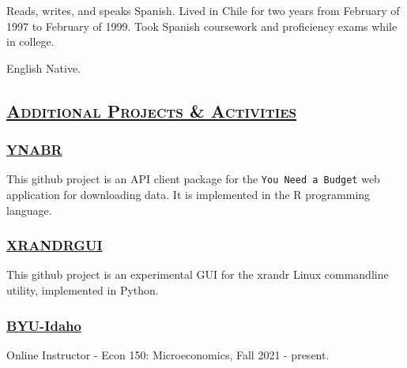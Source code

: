 \documentclass[
  letterpaper,
  DIV=11,
  numbers=noendperiod]{scrartcl}
\begin{document}
Reads, writes, and speaks Spanish. Lived in Chile for two years from
February of 1997 to February of 1999. Took Spanish coursework and
proficiency exams while in college.

English Native.

\hypertarget{additional-projects-activities}{%
\subsection{\texorpdfstring{\textsc{\ul{Additional Projects \&
Activities}}}{Additional Projects \& Activities}}\label{additional-projects-activities}}

\hypertarget{ynabr}{%
\subsubsection{\texorpdfstring{\href{http://joxborrow.github.io/ynabr}{YNABR}}{YNABR}}\label{ynabr}}

This github project is an API client package for the
\texttt{You\ Need\ a\ Budget} web application for downloading data. It
is implemented in the R programming language.

\hypertarget{xrandrgui}{%
\subsubsection{\texorpdfstring{\href{https://github.com/joxborrow/xrandrgui}{XRANDRGUI}}{XRANDRGUI}}\label{xrandrgui}}

This github project is an experimental GUI for the xrandr Linux
commandline utility, implemented in Python.

\hypertarget{byu-idaho}{%
\subsubsection{\texorpdfstring{\href{http://www.byui.edu}{BYU-Idaho}}{BYU-Idaho}}\label{byu-idaho}}

Online Instructor - Econ 150: Microeconomics, Fall 2021 - present.
\end{document}
